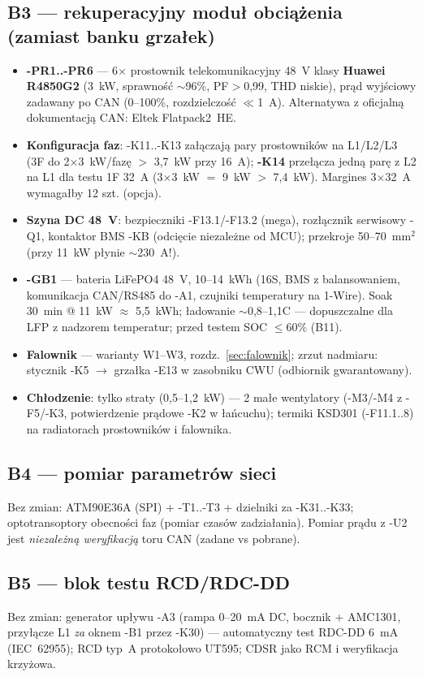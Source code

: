 \documentclass[11pt,a4paper]{article}
\begin{document}
\subsection{B3 --- rekuperacyjny moduł obciążenia (zamiast banku grzałek)}
\label{sec:b3}
\begin{itemize}
\item \textbf{-PR1..-PR6} --- 6$\times$ prostownik telekomunikacyjny 48~V klasy \textbf{Huawei
R4850G2} (3~kW, sprawność $\sim$96\%, PF$>$0,99, THD niskie), prąd wyjściowy zadawany po CAN
(0--100\%, rozdzielczość $\ll$1~A). Alternatywa z oficjalną dokumentacją CAN: Eltek Flatpack2~HE.
\item \textbf{Konfiguracja faz}: -K11..-K13 załączają pary prostowników na L1/L2/L3 (3F do
2$\times$3~kW/fazę $>$ 3,7~kW przy 16~A); \textbf{-K14} przełącza jedną parę z L2 na L1 dla testu
1F 32~A (3$\times$3~kW $=$ 9~kW $>$ 7,4~kW). Margines 3$\times$32~A wymagałby 12 szt. (opcja).
\item \textbf{Szyna DC 48~V}: bezpieczniki -F13.1/-F13.2 (mega), rozłącznik serwisowy -Q1,
kontaktor BMS -KB (odcięcie niezależne od MCU); przekroje 50--70~mm$^2$ (przy 11~kW płynie
$\sim$230~A!).
\item \textbf{-GB1} --- bateria LiFePO4 48~V, 10--14~kWh (16S, BMS z balansowaniem, komunikacja
CAN/RS485 do -A1, czujniki temperatury na 1-Wire). Soak 30~min @ 11~kW $\approx$ 5,5~kWh;
ładowanie $\sim$0,8--1,1C --- dopuszczalne dla LFP z nadzorem temperatur; przed testem SOC
$\le$60\% (B11).
\item \textbf{Falownik} --- warianty W1--W3, rozdz.~\ref{sec:falownik}; zrzut nadmiaru: stycznik
-K5 $\to$ grzałka -E13 w zasobniku CWU (odbiornik gwarantowany).
\item \textbf{Chłodzenie}: tylko straty (0,5--1,2~kW) --- 2 małe wentylatory (-M3/-M4 z -F5/-K3,
potwierdzenie prądowe -K2 w łańcuchu); termiki KSD301 (-F11.1..8) na radiatorach prostowników
i falownika.
\end{itemize}
\subsection{B4 --- pomiar parametrów sieci}
Bez zmian: ATM90E36A (SPI) + -T1..-T3 + dzielniki za -K31..-K33; optotransoptory obecności faz
(pomiar czasów zadziałania). Pomiar prądu z -U2 jest \emph{niezależną weryfikacją} toru CAN
(zadane vs pobrane).
\subsection{B5 --- blok testu RCD/RDC-DD}
Bez zmian: generator upływu -A3 (rampa 0--20~mA DC, bocznik + AMC1301, przyłącze L1 \emph{za}
oknem -B1 przez -K30) --- automatyczny test RDC-DD 6~mA (IEC~62955); RCD typ~A protokołowo UT595;
CDSR jako RCM i weryfikacja krzyżowa.
\end{document}
